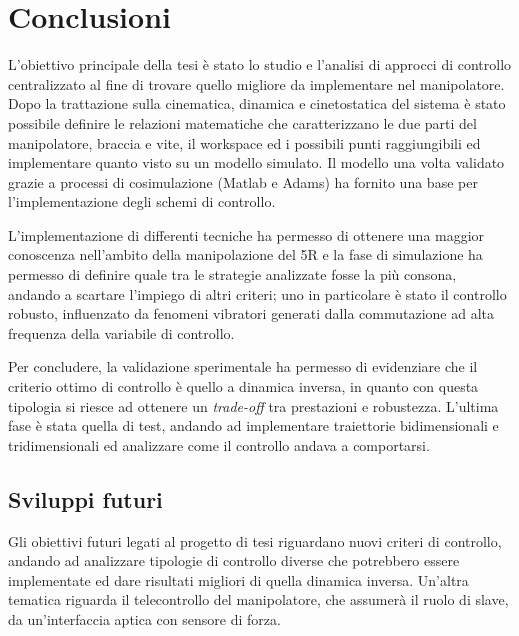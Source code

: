 \section{Conclusioni}
L'obiettivo principale della tesi è stato lo studio e l'analisi di approcci di controllo centralizzato al fine di trovare quello migliore da implementare nel manipolatore.
\\Dopo la trattazione sulla cinematica, dinamica e cinetostatica del sistema è stato possibile definire le relazioni matematiche che caratterizzano le due parti del manipolatore, braccia e vite, il workspace ed i possibili punti raggiungibili ed implementare quanto visto su un modello simulato. Il modello una volta validato grazie a processi di cosimulazione (Matlab e Adams) ha fornito una base per l'implementazione degli schemi di controllo.
\par L'implementazione di differenti tecniche ha permesso di ottenere una maggior conoscenza nell'ambito della manipolazione del 5R e la fase di simulazione ha permesso di definire quale tra le strategie analizzate fosse la più consona, andando a scartare l'impiego di altri criteri; uno in particolare è stato il controllo robusto, influenzato da fenomeni vibratori generati dalla commutazione ad alta frequenza della variabile di controllo.
\par Per concludere, la validazione sperimentale ha permesso di evidenziare che il criterio ottimo di controllo è quello a dinamica inversa, in quanto con questa tipologia si riesce ad ottenere un \textit{trade-off} tra prestazioni e  robustezza. L'ultima fase è stata quella di test, andando ad implementare traiettorie bidimensionali e tridimensionali ed analizzare come il controllo andava a comportarsi.
\subsection*{Sviluppi futuri}
Gli obiettivi futuri legati al progetto di tesi riguardano nuovi criteri di controllo, andando ad analizzare tipologie di controllo diverse che potrebbero essere implementate ed dare risultati migliori di quella dinamica inversa. Un'altra tematica riguarda il telecontrollo del manipolatore, che assumerà il ruolo di slave, da un'interfaccia aptica con sensore di forza.

